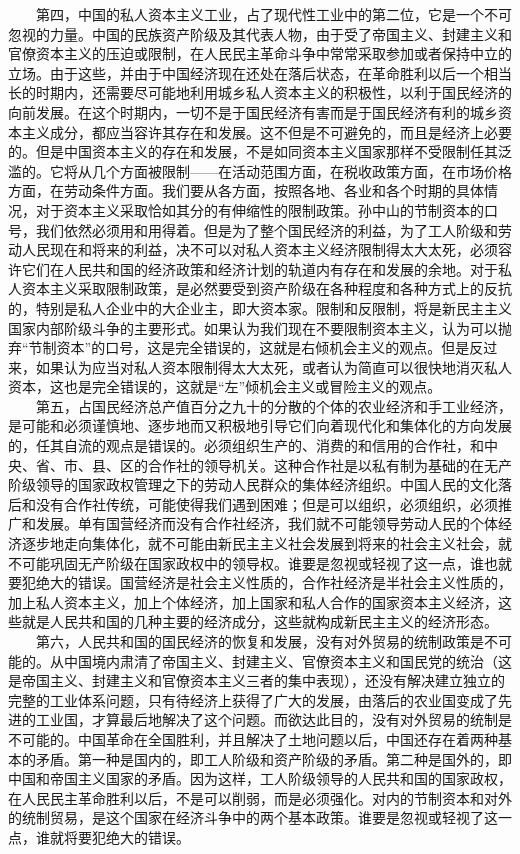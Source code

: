 \documentclass[cn,11pt,chinese]{elegantbook}
\begin{document}
　　第四，中国的私人资本主义工业，占了现代性工业中的第二位，它是一个不可忽视的力量。中国的民族资产阶级及其代表人物，由于受了帝国主义、封建主义和官僚资本主义的压迫或限制，在人民民主革命斗争中常常采取参加或者保持中立的立场。由于这些，并由于中国经济现在还处在落后状态，在革命胜利以后一个相当长的时期内，还需要尽可能地利用城乡私人资本主义的积极性，以利于国民经济的向前发展。在这个时期内，一切不是于国民经济有害而是于国民经济有利的城乡资本主义成分，都应当容许其存在和发展。这不但是不可避免的，而且是经济上必要的。但是中国资本主义的存在和发展，不是如同资本主义国家那样不受限制任其泛滥的。它将从几个方面被限制——在活动范围方面，在税收政策方面，在市场价格方面，在劳动条件方面。我们要从各方面，按照各地、各业和各个时期的具体情况，对于资本主义采取恰如其分的有伸缩性的限制政策。孙中山的节制资本的口号，我们依然必须用和用得着。但是为了整个国民经济的利益，为了工人阶级和劳动人民现在和将来的利益，决不可以对私人资本主义经济限制得太大太死，必须容许它们在人民共和国的经济政策和经济计划的轨道内有存在和发展的余地。对于私人资本主义采取限制政策，是必然要受到资产阶级在各种程度和各种方式上的反抗的，特别是私人企业中的大企业主，即大资本家。限制和反限制，将是新民主主义国家内部阶级斗争的主要形式。如果认为我们现在不要限制资本主义，认为可以抛弃“节制资本”的口号，这是完全错误的，这就是右倾机会主义的观点。但是反过来，如果认为应当对私人资本限制得太大太死，或者认为简直可以很快地消灭私人资本，这也是完全错误的，这就是“左”倾机会主义或冒险主义的观点。\\
　　第五，占国民经济总产值百分之九十的分散的个体的农业经济和手工业经济，是可能和必须谨慎地、逐步地而又积极地引导它们向着现代化和集体化的方向发展的，任其自流的观点是错误的。必须组织生产的、消费的和信用的合作社，和中央、省、市、县、区的合作社的领导机关。这种合作社是以私有制为基础的在无产阶级领导的国家政权管理之下的劳动人民群众的集体经济组织。中国人民的文化落后和没有合作社传统，可能使得我们遇到困难；但是可以组织，必须组织，必须推广和发展。单有国营经济而没有合作社经济，我们就不可能领导劳动人民的个体经济逐步地走向集体化，就不可能由新民主主义社会发展到将来的社会主义社会，就不可能巩固无产阶级在国家政权中的领导权。谁要是忽视或轻视了这一点，谁也就要犯绝大的错误。国营经济是社会主义性质的，合作社经济是半社会主义性质的，加上私人资本主义，加上个体经济，加上国家和私人合作的国家资本主义经济，这些就是人民共和国的几种主要的经济成分，这些就构成新民主主义的经济形态。\\
　　第六，人民共和国的国民经济的恢复和发展，没有对外贸易的统制政策是不可能的。从中国境内肃清了帝国主义、封建主义、官僚资本主义和国民党的统治（这是帝国主义、封建主义和官僚资本主义三者的集中表现），还没有解决建立独立的完整的工业体系问题，只有待经济上获得了广大的发展，由落后的农业国变成了先进的工业国，才算最后地解决了这个问题。而欲达此目的，没有对外贸易的统制是不可能的。中国革命在全国胜利，并且解决了土地问题以后，中国还存在着两种基本的矛盾。第一种是国内的，即工人阶级和资产阶级的矛盾。第二种是国外的，即中国和帝国主义国家的矛盾。因为这样，工人阶级领导的人民共和国的国家政权，在人民民主革命胜利以后，不是可以削弱，而是必须强化。对内的节制资本和对外的统制贸易，是这个国家在经济斗争中的两个基本政策。谁要是忽视或轻视了这一点，谁就将要犯绝大的错误。\\
\end{document}

